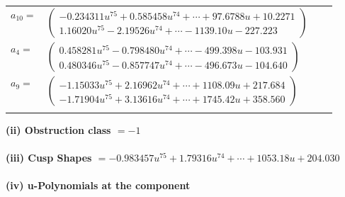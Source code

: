 \documentclass[1p]{elsarticle_modified}
\theoremstyle{definition}
\begin{document}
\begin{tabular}{m{7pt} m{180pt} m{7pt} m{180pt} }
\flushright $a_{10}=$&$\begin{pmatrix}-0.234311 u^{75}+0.585458 u^{74}+\cdots+97.6788 u+10.2271\\1.16020 u^{75}-2.19526 u^{74}+\cdots-1139.10 u-227.223\end{pmatrix}$ \\
\flushright $a_{4}=$&$\begin{pmatrix}0.458281 u^{75}-0.798480 u^{74}+\cdots-499.398 u-103.931\\0.480346 u^{75}-0.857747 u^{74}+\cdots-496.673 u-104.640\end{pmatrix}$ \\
\flushright $a_{9}=$&$\begin{pmatrix}-1.15033 u^{75}+2.16962 u^{74}+\cdots+1108.09 u+217.684\\-1.71904 u^{75}+3.13616 u^{74}+\cdots+1745.42 u+358.560\end{pmatrix}$\\&\end{tabular}
\flushleft \textbf{(ii) Obstruction class $= -1$}\\~\\
\flushleft \textbf{(iii) Cusp Shapes $= -0.983457 u^{75}+1.79316 u^{74}+\cdots+1053.18 u+204.030$}\\~\\
\newpage\renewcommand{\arraystretch}{1}
\flushleft \textbf{(iv) u-Polynomials at the component}\newline \\
\end{document}
